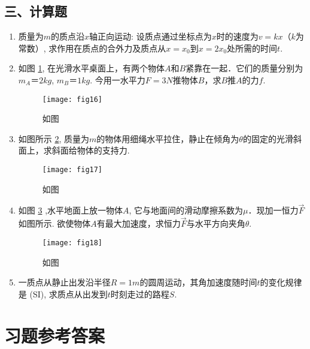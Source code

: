 \subsection*{三、计算题}
\begin{enumerate}
    \item 质量为$m$的质点沿$x$轴正向运动: 设质点通过坐标点为$x$时的速度为$v=kx$（$k$为常数）, 求作用在质点的合外力及质点从$x=x_0$到$x=2x_0$处所需的时间$t$.
    \item 如图 \ref{fig:16}, 在光滑水平桌面上，有两个物体$A$和$B$紧靠在一起．它们的质量分别为$m_A＝2kg$, $m_B＝1kg$. 今用一水平力$F=3N$推物体$B$，求$B$推$A$的力$f$. 
    \begin{figure}[ht]
        \centering
        \texttt{[image: fig16]}
            \caption{如图}\label{fig:16}
    \end{figure}
    \item 如图所示 \ref{fig:17}, 质量为$m$的物体用细绳水平拉住，静止在倾角为$\theta$的固定的光滑斜面上，求斜面给物体的支持力.
    \begin{figure}[H]
        \centering
        \texttt{[image: fig17]}
            \caption{如图}\label{fig:17}
    \end{figure}

     \item 如图 \ref{fig:18} ,水平地面上放一物体$A$, 它与地面间的滑动摩擦系数为$\mu$．现加一恒力$\vec{F}$如图所示. 欲使物体$A$有最大加速度，求恒力$\vec{F}$与水平方向夹角$\theta$.
     \begin{figure}[H]
        \centering
        \texttt{[image: fig18]}
            \caption{如图}\label{fig:18}
    \end{figure}
    \item 一质点从静止出发沿半径$R=1m$的圆周运动，其角加速度随时间$t$的变化规律是 (SI), 求质点从出发到$t$时刻走过的路程$S$.
        
\end{enumerate}

\section{习题参考答案}
